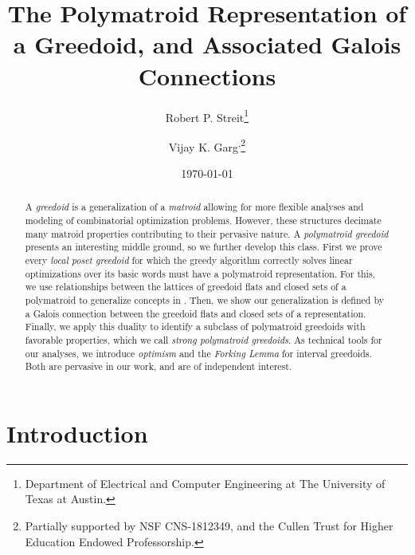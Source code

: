 \documentclass[11pt]{article}
\title{The Polymatroid Representation of a Greedoid, and Associated Galois Connections}
\author{Robert P. Streit\thanks{Department of Electrical and Computer Engineering at The University of Texas at Austin.} \and Vijay K. Garg\footnotemark[1]\textsuperscript{\;\:,}\thanks{Partially supported by NSF CNS-1812349, and the Cullen Trust for
Higher Education Endowed Professorship.}}
\date{\today}
\begin{document}
\maketitle

\begin{abstract}
    A \emph{greedoid} is a generalization of a \emph{matroid} allowing for more flexible analyses and modeling of combinatorial optimization problems.
    However, these structures decimate many matroid properties contributing to their pervasive nature.
    A \emph{polymatroid greedoid} \cite{korte1985polymatroid} presents an interesting middle ground,
    so we further develop this class.
    First we prove every \emph{local poset greedoid} for which the greedy algorithm correctly solves linear optimizations over its basic words must have a polymatroid representation.
    For this, we use relationships between the lattices of greedoid flats and closed sets of a polymatroid to generalize concepts in \cite{korte1985polymatroid}.
    Then, we show our generalization is defined by a Galois connection between the greedoid flats and closed sets of a representation.
    Finally, we apply this duality to identify a subclass of polymatroid greedoids with favorable properties, which we call \emph{strong polymatroid greedoids}.
    As technical tools for our analyses, we introduce \emph{optimism} and the \emph{Forking Lemma} for interval greedoids.
    Both are pervasive in our work, and are of independent interest.
\end{abstract}

\section{Introduction}
\end{document}
